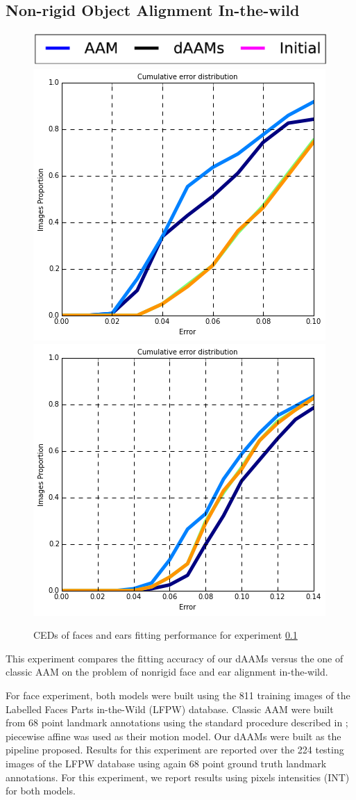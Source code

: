 \subsection{Non-rigid Object Alignment In-the-wild}
\label{exp:daam_benchmark}
\begin{figure}[b!]
    \centering
    \includegraphics[width=\columnwidth]{resources/DAAMBenchmark/legend}
    \\
    \includegraphics[width=0.48\columnwidth]{resources/DAAMBenchmark/face}
    \includegraphics[width=0.48\columnwidth]{resources/DAAMBenchmark/ear}
    \caption{CEDs of faces and ears fitting performance for experiment \ref{exp:daam_benchmark}}
    \label{fig:daam_benchmark}
\end{figure}


This experiment compares the fitting accuracy of our dAAMs versus the one of classic AAM on the problem of nonrigid face and ear alignment in-the-wild. 

For face experiment, both models were built using the 811 training images of the Labelled
Faces Parts in-the-Wild (LFPW) \cite{Asthana2014} database. Classic AAM were built from 68 point landmark annotations using the standard procedure described in \cite{Cootes2001,Matthews2004}; piecewise affine was used as their motion model. Our dAAMs were built as the pipeline proposed. Results for this experiment are reported over the 224 testing images of the LFPW database using again 68 point ground truth landmark annotations. For this experiment, we report results using pixels intensities (INT) for both models. 

